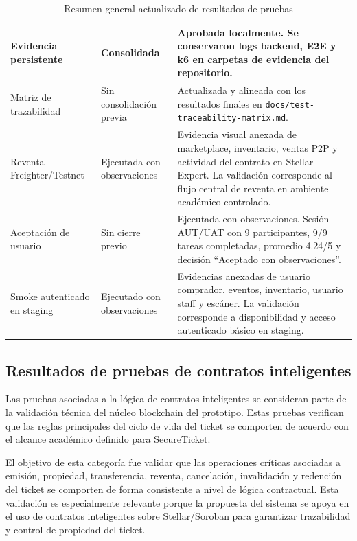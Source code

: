 \documentclass[12pt,letterpaper]{article}
\newcommand{\NombreProyecto}{SecureTicket}
\begin{document}
\begin{table}[H]
\begin{tabularx}{\textwidth}{|
>{\raggedright\arraybackslash}p{3.5cm}|
>{\raggedright\arraybackslash}p{3.7cm}|
>{\raggedright\arraybackslash}X|}
\hline
Evidencia persistente & Consolidada & Aprobada localmente. Se conservaron logs backend, E2E y k6 en carpetas de evidencia del repositorio. \\
\hline
Matriz de trazabilidad & Sin consolidación previa & Actualizada y alineada con los resultados finales en \texttt{docs/test-traceability-matrix.md}. \\
\hline
Reventa Freighter/Testnet & Ejecutada con observaciones & Evidencia visual anexada de marketplace, inventario, ventas P2P y actividad del contrato en Stellar Expert. La validación corresponde al flujo central de reventa en ambiente académico controlado. \\
\hline
Aceptación de usuario & Sin cierre previo & Ejecutada con observaciones. Sesión AUT/UAT con 9 participantes, 9/9 tareas completadas, promedio 4.24/5 y decisión ``Aceptado con observaciones''. \\
\hline
Smoke autenticado en staging & Ejecutado con observaciones & Evidencias anexadas de usuario comprador, eventos, inventario, usuario staff y escáner. La validación corresponde a disponibilidad y acceso autenticado básico en staging. \\
\hline
\end{tabularx}

\endgroup
\caption{Resumen general actualizado de resultados de pruebas}
\label{tab:resumen-resultados-actualizado}
\end{table}

\subsection{Resultados de pruebas de contratos inteligentes}

Las pruebas asociadas a la lógica de contratos inteligentes se consideran parte de la validación técnica del núcleo blockchain del prototipo. Estas pruebas verifican que las reglas principales del ciclo de vida del ticket se comporten de acuerdo con el alcance académico definido para \NombreProyecto{}.

El objetivo de esta categoría fue validar que las operaciones críticas asociadas a emisión, propiedad, transferencia, reventa, cancelación, invalidación y redención del ticket se comporten de forma consistente a nivel de lógica contractual. Esta validación es especialmente relevante porque la propuesta del sistema se apoya en el uso de contratos inteligentes sobre Stellar/Soroban para garantizar trazabilidad y control de propiedad del ticket.
\end{document}
